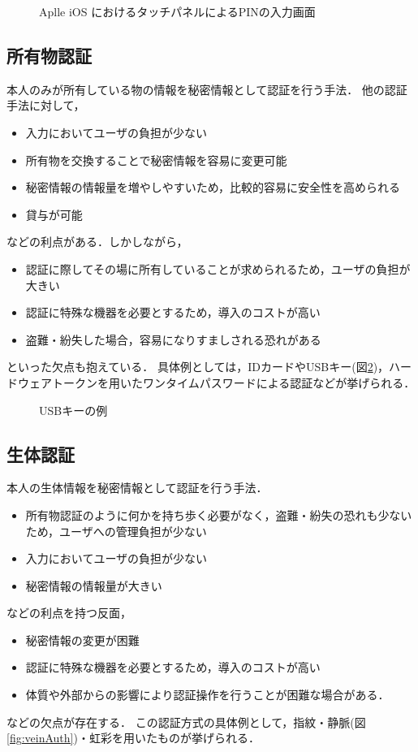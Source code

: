 \begin{figure}[th]
\begin{center}
\end{center}
\caption{Aplle iOS におけるタッチパネルによるPINの入力画面}
\label{fig:iosPIN}
\end{figure}

\subsection{所有物認証}\label{subsec:possession}
本人のみが所有している物の情報を秘密情報として認証を行う手法．
他の認証手法に対して，
\begin{itemize}
\item 入力においてユーザの負担が少ない
\item 所有物を交換することで秘密情報を容易に変更可能
\item 秘密情報の情報量を増やしやすいため，比較的容易に安全性を高められる
\item 貸与が可能
\end{itemize}
などの利点がある．しかしながら，
\begin{itemize}
\item 認証に際してその場に所有していることが求められるため，ユーザの負担が大きい
\item 認証に特殊な機器を必要とするため，導入のコストが高い
\item 盗難・紛失した場合，容易になりすましされる恐れがある
\end{itemize}
といった欠点も抱えている．
具体例としては，IDカードやUSBキー(図\ref{fig:dongle})，ハードウェアトークンを用いたワンタイムパスワードによる認証などが挙げられる．

\begin{figure}[th]
\begin{center}
\end{center}
\caption{USBキーの例}
\label{fig:dongle}
\end{figure}


\subsection{生体認証}\label{subsec:inherence}
本人の生体情報を秘密情報として認証を行う手法．
\begin{itemize}
\item 所有物認証のように何かを持ち歩く必要がなく，盗難・紛失の恐れも少ないため，ユーザへの管理負担が少ない
\item 入力においてユーザの負担が少ない
\item 秘密情報の情報量が大きい
\end{itemize}
などの利点を持つ反面，
\begin{itemize}
\item 秘密情報の変更が困難
\item 認証に特殊な機器を必要とするため，導入のコストが高い
\item 体質や外部からの影響により認証操作を行うことが困難な場合がある．
\end{itemize}
などの欠点が存在する．
この認証方式の具体例として，指紋・静脈(図\ref{fig:veinAuth})・虹彩を用いたものが挙げられる．

